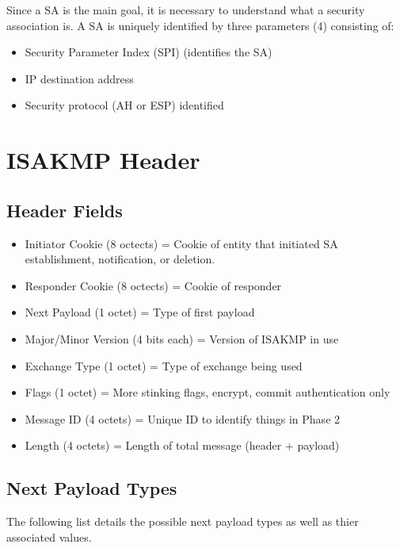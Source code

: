 \documentclass{report}
\newcommand{\squash}{\itemsep=0pt\parskip=0pt}
\begin{document}
Since a SA is the main goal, it is necessary to understand what a security association is. A SA is uniquely identified by three parameters (4) consisting of:
\begin{itemize}
\item Security Parameter Index (SPI) (identifies the SA)
\item IP destination address
\item Security protocol (AH or ESP) identified
\end{itemize}

\section {ISAKMP Header}

\subsection {Header Fields}

\begin{itemize}
   \squash
\item Initiator Cookie (8 octects) = Cookie of entity that initiated SA establishment, notification, or deletion.
\item Responder Cookie (8 octects) = Cookie of responder 
\item Next Payload (1 octet) = Type of first payload
\item Major/Minor Version (4 bits each) = Version of ISAKMP in use
\item Exchange Type (1 octet) = Type of exchange being used
\item Flags (1 octet) = More stinking flags, encrypt, commit authentication only
\item Message ID (4 octets) = Unique ID to identify things in Phase 2
\item Length (4 octets) = Length of total message (header + payload)
\end{itemize}

\subsection {Next Payload Types}

The following list details the possible next payload types as well as thier associated values.
\end{document}
